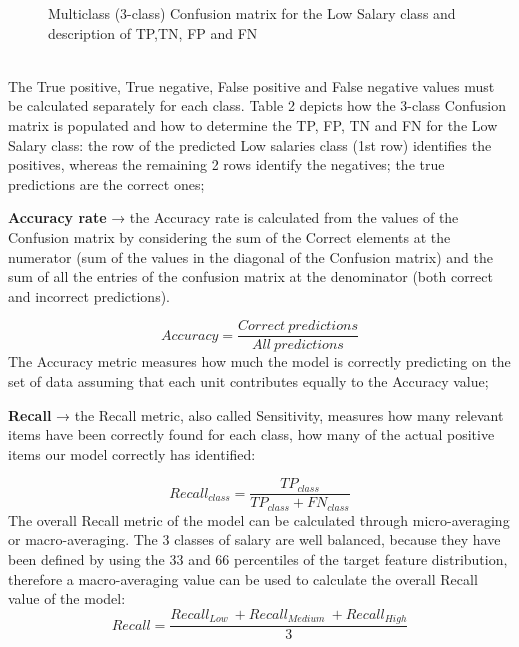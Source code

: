 \documentclass[11pt,a4paper]{article}
\newcommand{\SubItem}[1]{
  {\setlength\itemindent{13pt} \item[◦] #1}
}
\begin{document}
\begin{itemize}
{\begin{figure}
    \caption{Multiclass (3-class) Confusion matrix for the Low Salary class and description of TP,TN, FP and FN}
    \label{fig:Multiclass (3-class) Confusion matrix for the Low Salary class}
\end{figure}
\\
The True positive, True negative, False positive and False negative values must be calculated separately for each class. Table 2 depicts how the 3-class Confusion matrix is populated and how to determine the TP, FP, TN and FN for the Low Salary class: the row of the predicted Low salaries class (1st row) identifies the positives, whereas the remaining 2 rows identify the negatives; the true predictions are the correct ones;}
\SubItem{\textbf{Accuracy rate} → the Accuracy rate is calculated from the values of the Confusion matrix by considering the sum of the Correct elements at the numerator (sum of the values in the diagonal of the Confusion matrix) and the sum of all the entries of the confusion matrix at the denominator (both correct and incorrect predictions).}
\begin{displaymath}
Accuracy = \frac{Correct\ predictions}{All\ predictions} 
\end{displaymath}
The Accuracy metric measures how much the model is correctly predicting on the set of data assuming that each unit contributes equally to the Accuracy value;
\SubItem{\textbf{Recall} → the Recall metric, also called Sensitivity, measures how many relevant items have been correctly found for each class, how many of the actual positive items our model correctly has identified:}
\begin{displaymath}
Recall_{class} = \frac{TP_{class}}{TP_{class} + FN_{class}} 
\end{displaymath}
The overall Recall metric of the model can be calculated through micro-averaging or macro-averaging. The 3 classes of salary are well balanced, because they have been defined by using the 33 and 66 percentiles of the target feature distribution, therefore a macro-averaging value can be used to calculate the overall Recall value of the model:
\begin{displaymath}
Recall = \frac{Recall_{Low}\ + Recall_{Medium}\ + Recall_{High}}{3} 
\end{displaymath}


\end{itemize}
\end{document}
